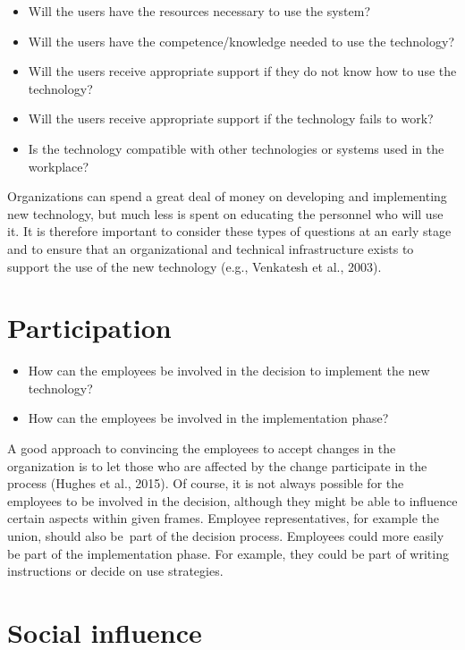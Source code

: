 \documentclass[
  12pt,
]{scrbook}
\begin{document}
\begin{itemize}
\item
  Will the users have the resources necessary to use the system?
\item
  Will the users have the competence/knowledge needed to use the technology?
\item
  Will the users receive appropriate support if they do not know how to use the technology?
\item
  Will the users receive appropriate support if the technology fails to work?
\item
  Is the technology compatible with other technologies or systems used in the workplace?
\end{itemize}

Organizations can spend a great deal of money on developing and implementing new technology, but much less is spent on educating the personnel who will use it. It is therefore important to consider these types of questions at an early stage and to ensure that an organizational and technical infrastructure exists to support the use of the new technology (e.g., Venkatesh et al., 2003).~

\hypertarget{participation}{%
\section*{Participation}\label{participation}}

\begin{itemize}
\item
  How can the employees be involved in the decision to implement the new technology?
\item
  How can the employees be involved in the implementation phase?
\end{itemize}

A good approach to convincing the employees to accept changes in the organization is to let those who are affected by the change participate in the process (Hughes et al., 2015). Of course, it is not always possible for the employees to be involved in the decision, although they might be able to influence certain aspects within given frames. Employee representatives, for example the union, should also be~part of the decision process. Employees could more easily be part of the implementation phase. For example, they could be part of writing instructions or decide on use strategies.

\hypertarget{social-influence}{%
\section*{Social influence~}\label{social-influence}}
\end{document}
